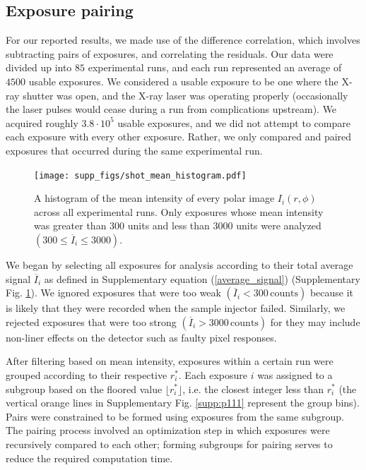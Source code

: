\documentclass [12pt,fleqn]{article}
\begin{document}
\subsection{Exposure pairing} \label{pairing}
For our reported results, we made use of the difference correlation, which involves subtracting pairs of exposures, and correlating the residuals. Our data were divided up into $85$ experimental  runs, and each run represented an average of $4500$ usable exposures. We considered a usable exposure to be one where the X-ray shutter was open, and the X-ray laser was operating properly (occasionally the laser pulses would cease during a run from complications upstream). We acquired roughly $3.8 \cdot 10^5$ usable exposures, and we did not attempt to compare each exposure with every other exposure. Rather, we only compared and paired exposures that occurred during the same experimental run.

\begin{figure}[H]
\texttt{[image: supp\_figs/shot\_mean\_histogram.pdf]}
\caption{A histogram of the mean intensity of every polar image $I_i(r,\phi)$ across all experimental runs. Only exposures whose mean intensity was greater than 300 units and less than 3000 units were analyzed $(300 \le \overline I_i \le 3000)$.}
\label{fig:shot_mean_histogram}
\end{figure}
We began by selecting all exposures for analysis according to their total average signal $\overline I_i$ as defined in Supplementary equation (\ref{average_signal}) (Supplementary Fig. \ref{fig:shot_mean_histogram}). We ignored exposures that were too weak $(\overline I_i < 300 \mathrm{\,counts})$ because it is likely that they were recorded when the sample injector failed. Similarly, we rejected exposures that were too strong $(\overline I_i > 3000 \mathrm{\,counts})$ for they may include non-liner effects on the detector such as faulty pixel responses.

After filtering based on mean intensity, exposures within a certain run were grouped according to their respective $r^*_i$. Each exposure $i$ was assigned to a subgroup based on the floored value $\lfloor r^*_i \rfloor$, i.e. the closest integer less than $r^*_i$ (the vertical orange lines in Supplementary Fig. \ref{supp:p111} represent the group bins). Pairs were constrained to be formed using exposures from the same subgroup. The pairing process involved an optimization step in which exposures were recursively compared to each other; forming subgroups for pairing serves to reduce the required computation time. 
\end{document}
